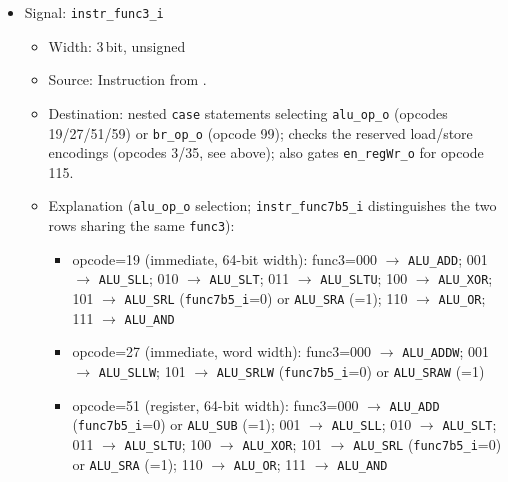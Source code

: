 \begin{itemize}
\begin{itemize}
\begin{itemize}
\begin{itemize}
          top level (\texttt{as\_cpux}/\texttt{cc\_cpupipefwd}); see
          Section~\ref{subsec:irqconcept}.
      \end{itemize}
      \item default (any other opcode):
      \begin{itemize}
        \item trap\_illegal\_instr\_o=1; all other outputs stay at their
          default (inert) value.
      \end{itemize}
    \end{itemize}
  \end{itemize}
  \item Signal: \texttt{instr\_func3\_i}
  \begin{itemize}
    \item Width: 3\,bit, unsigned
    \item Source: Instruction from .
    \item Destination: nested \texttt{case} statements selecting
      \texttt{alu\_op\_o} (opcodes 19/27/51/59) or \texttt{br\_op\_o}
      (opcode 99); checks the reserved load/store encodings (opcodes 3/35,
      see above); also gates \texttt{en\_regWr\_o} for opcode 115.
    \item Explanation (\texttt{alu\_op\_o} selection; \texttt{instr\_func7b5\_i}
      distinguishes the two rows sharing the same \texttt{func3}):
    \begin{itemize}
      \item opcode=19 (immediate, 64-bit width): func3=000 $\to$
        \texttt{ALU\_ADD}; 001 $\to$ \texttt{ALU\_SLL}; 010 $\to$
        \texttt{ALU\_SLT}; 011 $\to$ \texttt{ALU\_SLTU}; 100 $\to$
        \texttt{ALU\_XOR}; 101 $\to$ \texttt{ALU\_SRL}
        (\texttt{func7b5\_i}=0) or \texttt{ALU\_SRA} (=1); 110 $\to$
        \texttt{ALU\_OR}; 111 $\to$ \texttt{ALU\_AND}
      \item opcode=27 (immediate, word width): func3=000 $\to$
        \texttt{ALU\_ADDW}; 001 $\to$ \texttt{ALU\_SLLW}; 101 $\to$
        \texttt{ALU\_SRLW} (\texttt{func7b5\_i}=0) or \texttt{ALU\_SRAW} (=1)
      \item opcode=51 (register, 64-bit width): func3=000 $\to$
        \texttt{ALU\_ADD} (\texttt{func7b5\_i}=0) or \texttt{ALU\_SUB} (=1);
        001 $\to$ \texttt{ALU\_SLL}; 010 $\to$ \texttt{ALU\_SLT}; 011 $\to$
        \texttt{ALU\_SLTU}; 100 $\to$ \texttt{ALU\_XOR}; 101 $\to$
        \texttt{ALU\_SRL} (\texttt{func7b5\_i}=0) or \texttt{ALU\_SRA} (=1);
        110 $\to$ \texttt{ALU\_OR}; 111 $\to$ \texttt{ALU\_AND}

\end{itemize}
\end{itemize}
\end{itemize}

